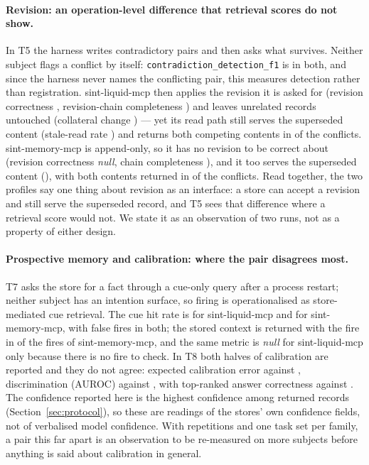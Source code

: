 \documentclass[11pt,a4paper]{article}
\begin{document}
\paragraph{Revision: an operation-level difference that retrieval scores do not show.} In T5 the
harness writes contradictory pairs and then asks what survives. Neither subject flags a conflict
by itself: \texttt{contradiction\_detection\_f1} is
 in both, and since the harness never names the
conflicting pair, this measures detection rather than registration. sint-liquid-mcp then applies
the revision it is asked for (revision correctness ,
revision-chain completeness ) and leaves unrelated records
untouched (collateral change ) --- yet its read path still
serves the superseded content (stale-read rate ) and returns both
competing contents in  of the conflicts.
sint-memory-mcp is append-only, so it has no revision to be correct about (revision correctness
\textit{null}, chain completeness ), and it too serves the
superseded content (), with both contents returned in
 of the conflicts. Read together, the two
profiles say one thing about revision as an interface: a store can accept a revision and still
serve the superseded record, and T5 sees that difference where a retrieval score would not. We
state it as an observation of two runs, not as a property of either design.

\paragraph{Prospective memory and calibration: where the pair disagrees most.} T7 asks the store
for a fact through a cue-only query after a process restart; neither subject has an intention
surface, so firing is operationalised as store-mediated cue retrieval. The cue hit rate is
 for sint-liquid-mcp and  for
sint-memory-mcp, with false fires  in both; the stored context is
returned with the fire in  of the fires of
sint-memory-mcp, and the same metric is \textit{null} for sint-liquid-mcp only because there is
no fire to check. In T8 both halves of calibration are reported and they do not agree: expected
calibration error  against , discrimination (AUROC)
 against , with top-ranked
answer correctness  against
. The confidence reported here is the highest
confidence among returned records (Section~\ref{sec:protocol}), so these are readings of the
stores' own confidence fields, not of verbalised model confidence. With 
repetitions and one task set per family, a pair this far apart is an observation to be
re-measured on more subjects before anything is said about calibration in general.
\end{document}
